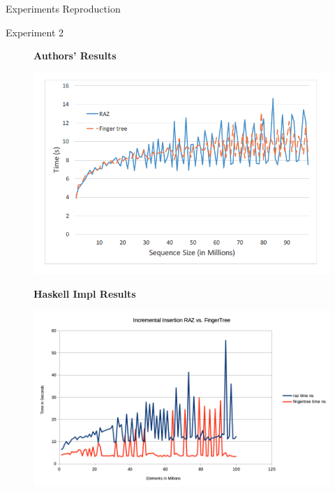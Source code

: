 \documentclass{beamer}
\begin{document}
\begin{frame}[fragile]{Experiments Reproduction}

  \begin{block}{Experiment 2}
  \begin{figure}[!tbp]
  \centering
  \textbf{Authors' Results}\par\medskip
   \begin{minipage}[b]{0.4\textwidth}
     \begin{center}
      \includegraphics[width=\textwidth]{author_exp_2}
     \end{center}
  \end{minipage}

   \textbf{Haskell Impl Results}\par\medskip
    \begin{minipage}[b]{0.4\textwidth}
     \begin{center}
      \includegraphics[width=\textwidth]{raz_ftree_exp_2}
     \end{center}
   \end{minipage}

 \end{figure}
  \end{block}

\end{frame}
\end{document}
